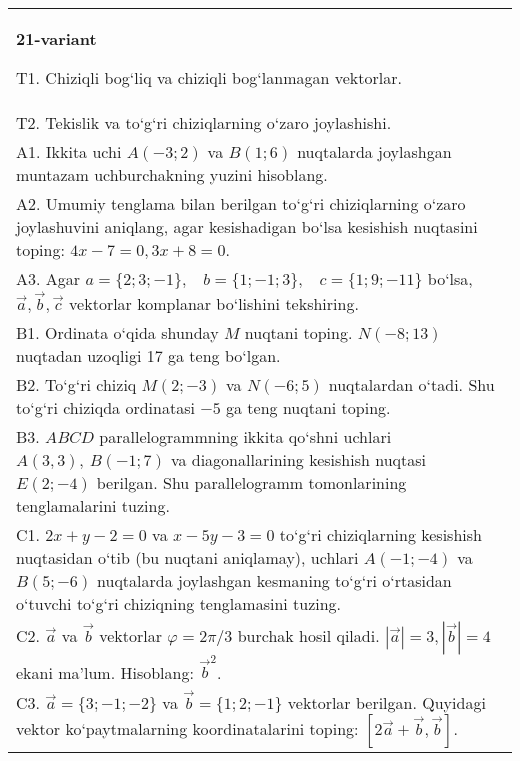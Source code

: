 \documentclass{article}
\begin{document}
\begin{tabular}{m{17cm}}
\textbf{21-variant}

T1. 
Chiziqli bog‘liq va chiziqli bog‘lanmagan vektorlar.
 \\
T2. 
Tekislik va to‘g‘ri chiziqlarning o‘zaro joylashishi.
 \\
A1. 
Ikkita uchi $A (-3; 2) $ va $B (1; 6) $ nuqtalarda
joylashgan muntazam uchburchakning yuzini hisoblang.
 \\
A2. 
Umumiy tenglama bilan berilgan to‘g‘ri chiziqlarning
o‘zaro joylashuvini aniqlang, agar kesishadigan bo‘lsa kesishish nuqtasini
toping: $4x-7=0, 3x+8=0$.
 \\
A3. 
Agar \(a = \{ 2;3; - 1\}, \ \ \ \ b = \{ 1; - 1;3\}, \ \ \ \ c = \{ 1;9; - 11\}\) bo‘lsa, $\overrightarrow{a}, \overrightarrow{b}, \overrightarrow{c}$ vektorlar komplanar bo‘lishini tekshiring.
 \\
B1. 
Ordinata o‘qida shunday $M$ nuqtani toping.
\(N (-8;13) \) nuqtadan uzoqligi 17 ga teng bo‘lgan.
 \\
B2. 
To‘g‘ri chiziq \(M (2;-3) \) va \(N (-6;5) \) nuqtalardan o‘tadi.
Shu to‘g‘ri chiziqda ordinatasi $-5$ ga teng nuqtani toping.
 \\
B3. 
$ABCD$ parallelogrammning ikkita qo‘shni uchlari
\(A (3,3),\ B (-1;7) \) va diagonallarining kesishish nuqtasi
\(E (2;-4) \) berilgan. Shu parallelogramm tomonlarining tenglamalarini
tuzing.
 \\
C1. 
\(2x+y-2=0\) va \(x-5y-3=0\)
to‘g‘ri chiziqlarning kesishish nuqtasidan o‘tib (bu nuqtani aniqlamay), uchlari
\(A (-1;-4) \) va \(B (5;-6) \) nuqtalarda joylashgan kesmaning
to‘g‘ri o‘rtasidan o‘tuvchi to‘g‘ri chiziqning tenglamasini tuzing.
 \\
C2. 
$\vec{a}$ va $\vec{b}$ vektorlar $\varphi = 2\pi/3$ burchak hosil qiladi. $|\vec{a}| = 3,|\vec{b}| = 4$ ekani ma’lum. Hisoblang:
${\vec{b}}^{2}$.
 \\
C3. 
$\vec{a} = \{ 3; - 1; - 2\}$ va $\vec{b} = \{ 1;2; - 1\}$ vektorlar berilgan. Quyidagi vektor ko‘paytmalarning koordinatalarini toping:
$\left\lbrack 2\vec{a} + \vec{b},\vec{b} \right\rbrack$.
 \\

\end{tabular}
\vspace{1cm}
\end{document}

